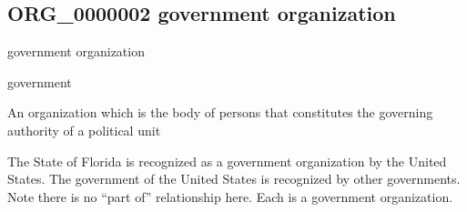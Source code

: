 \documentclass[letterpaper,10pt,english]{sphinxmanual}
\begin{document}
\subsection{ORG\_0000002 \sphinxhyphen{} government organization}
\label{\detokenize{doc-ORG_0000002:org-0000002-government-organization}}\label{\detokenize{doc-ORG_0000002:index-0}}\label{\detokenize{doc-ORG_0000002::doc}}
\begin{sphinxShadowBox}

\sphinxAtStartPar
government organization
\end{sphinxShadowBox}

\begin{sphinxShadowBox}

\sphinxAtStartPar
government
\end{sphinxShadowBox}

\begin{sphinxShadowBox}

\sphinxAtStartPar
{\hyperref[\detokenize{doc-ORG_0000001::doc}]{}}
\end{sphinxShadowBox}

\begin{sphinxShadowBox}

\sphinxAtStartPar
An organization which is the body of persons that constitutes the governing authority of a political unit
\end{sphinxShadowBox}

\begin{sphinxShadowBox}

\sphinxAtStartPar
{}
\end{sphinxShadowBox}

\begin{sphinxShadowBox}

\sphinxAtStartPar
The State of Florida is recognized as a government organization by the United States.  The government of the United States is recognized by other governments.  Note there is no “part of” relationship here.  Each is a government organization.
\end{sphinxShadowBox}

\begin{sphinxShadowBox}

\sphinxAtStartPar
{}
\end{sphinxShadowBox}
\end{document}
